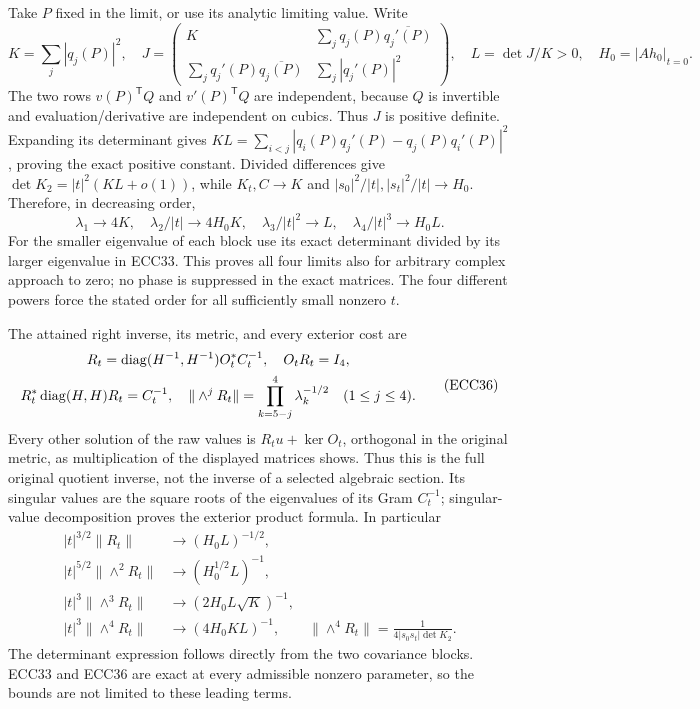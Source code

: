 \documentclass[11pt]{article}
\begin{document}
Take $P$ fixed in the limit, or use its analytic limiting value. Write
\begin{equation}
 K=\sum_j|q_j(P)|^2,\quad
 J=\begin{pmatrix}
 K&\sum_jq_j(P)\overline{q_j'(P)}\\
 \sum_jq_j'(P)\overline{q_j(P)}&\sum_j|q_j'(P)|^2
 \end{pmatrix},\quad L=\det J/K>0,\quad H_0=|Ah_0|_{t=0}.
 \tag{ECC34}
\end{equation}
The two rows $v(P)^{\mathsf T}Q$ and $v'(P)^{\mathsf T}Q$ are independent,
because $Q$ is invertible and evaluation/derivative are independent on
cubics. Thus $J$ is positive definite. Expanding its determinant gives
$KL=\sum_{i<j}|q_i(P)q_j'(P)-q_j(P)q_i'(P)|^2$, proving the exact
positive constant. Divided differences give
$\det K_2=|t|^2(KL+o(1))$, while $K_t,C\to K$ and
$|s_0|^2/|t|,|s_t|^2/|t|\to H_0$. Therefore, in decreasing order,
\begin{equation}
 \lambda_1\to4K,\quad
 \lambda_2/|t|\to4H_0K,\quad
 \lambda_3/|t|^2\to L,\quad
 \lambda_4/|t|^3\to H_0L.
 \tag{ECC35}
\end{equation}
For the smaller eigenvalue of each block use its exact determinant
divided by its larger eigenvalue in ECC33. This proves all four limits
also for arbitrary complex approach to zero; no phase is suppressed in
the exact matrices. The four different powers force the stated order
for all sufficiently small nonzero $t$.

The attained right inverse, its metric, and every exterior cost are
\begin{equation}
 \begin{gathered}
 R_t=\operatorname{diag}(H^{-1},H^{-1})O_t^*C_t^{-1},\quad
 O_tR_t=I_4,\\ R_t^*\operatorname{diag}(H,H)R_t=C_t^{-1},\quad
 \|\wedge^jR_t\|=\prod_{k=5-j}^4\lambda_k^{-1/2}\quad(1\le j\le4).
 \end{gathered}
 \tag{ECC36}
\end{equation}
Every other solution of the raw values is $R_tu+\ker O_t$, orthogonal
in the original metric, as multiplication of the displayed matrices
shows. Thus this is the full original quotient inverse, not the inverse
of a selected algebraic section. Its singular values are the square
roots of the eigenvalues of its Gram $C_t^{-1}$; singular-value
decomposition proves the exterior product formula. In particular
\begin{equation}
 \begin{aligned}
 |t|^{3/2}\|R_t\|&\longrightarrow(H_0L)^{-1/2},\\
 |t|^{5/2}\|\wedge^2R_t\|&\longrightarrow(H_0^{1/2}L)^{-1},\\
 |t|^3\|\wedge^3R_t\|&\longrightarrow(2H_0L\sqrt K)^{-1},\\
 |t|^3\|\wedge^4R_t\|&\longrightarrow(4H_0KL)^{-1},\qquad
 \|\wedge^4R_t\|=\frac1{4|s_0s_t|\det K_2}.
 \end{aligned}\tag{ECC37}
\end{equation}
The determinant expression follows directly from the two covariance
blocks. ECC33 and ECC36 are exact at every admissible nonzero parameter,
so the bounds are not limited to these leading terms.
\end{document}
